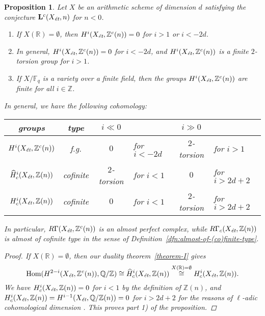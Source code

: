 \documentclass[draft,leqno,12pt]{article}
\theoremstyle{plain}
\newtheorem{proposition}[theorem]{\indent\sc Proposition}
\theoremstyle{definition}
\DeclareMathOperator{\Hom}{Hom}
\newcommand{\ZZ}{\mathbb{Z}}
\newcommand{\QQ}{\mathbb{Q}}
\newcommand{\RR}{\mathbb{R}}
\newcommand{\FF}{\mathbb{F}}
\newcommand{\et}{\text{\it \'{e}t}}
\begin{document}
\begin{proposition}
  \label{prop:motivic-cohomology-duality-consequences}
  Let $X$ be an arithmetic scheme of dimension $d$ satisfying the conjecture
  $\mathbf{L}^c (X_\et,n)$ for $n < 0$.

  \begin{enumerate}
  \item[$1)$] If $X (\RR) = \emptyset$, then $H^i (X_\et, \ZZ^c (n)) = 0$ for
    $i > 1$ or $i < -2d$.

  \item[$2)$] In general, $H^i (X_\et, \ZZ^c (n)) = 0$ for $i < -2d$, and
    $H^i (X_\et, \ZZ^c (n))$ is a finite $2$-torsion group for $i > 1$.

  \item[$3)$] If $X/\FF_q$ is a variety over a finite field, then the groups
    $H^i (X_\et, \ZZ^c(n))$ are finite for all $i \in \ZZ$.
  \end{enumerate}

  In general, we have the following cohomology:
  \begin{center}
    \renewcommand{\arraystretch}{1.5}
    \begin{tabular}{ccclcl}
      \hline
      \textbf{groups} & \textbf{type} & $i \ll 0$ & & $i \gg 0$ \\
      \hline
      $H^i (X_\et, \ZZ^c (n))$ & f.g. & $0$ & for $i < -2d$ & $2$-torsion & for $i > 1$ \\
      $\widehat{H}^i_c (X_\et, \ZZ (n))$ & cofinite & $2$-torsion & for $i < 1$ & $0$ & for $i > 2d + 2$ \\
      $H^i_c (X_\et, \ZZ (n))$ & cofinite & $0$ & for $i < 1$ & $2$-torsion & for $i > 2d + 2$ \\
      \hline
    \end{tabular}
  \end{center}
  In particular, $R\Gamma (X_\et, \ZZ^c (n))$ is an almost perfect complex,
  while $R\Gamma_c (X_\et, \ZZ (n))$ is almost of cofinite type in the sense of
  Definition~\ref{dfn:almost-of-(co)finite-type}.

  \begin{proof}
    If $X (\RR) = \emptyset$, then our duality theorem~\ref{theorem-I} gives
    \[ \Hom (H^{2-i} (X_\et, \ZZ^c (n)), \QQ/\ZZ) \cong
      \widehat{H}^i_c (X_\et, \ZZ (n)) \stackrel{X(\RR)=\emptyset}{\cong}
      H^i_c (X_\et, \ZZ (n)). \]
    We have $H^i_c (X_\et, \ZZ (n)) = 0$ for $i < 1$ by the definition of
    $\ZZ (n)$, and $H^i_c (X_\et, \ZZ (n)) = H^{i-1} (X_\et, \QQ/\ZZ(n)) = 0$
    for $i > 2d + 2$ for the reasons of $\ell$-adic cohomological dimension
    \cite[Expos\'{e}~X, Th\'{e}or\`{e}me~6.2]{SGA4}. This proves part 1) of the proposition.


\end{proof}
\end{proposition}
\end{document}
